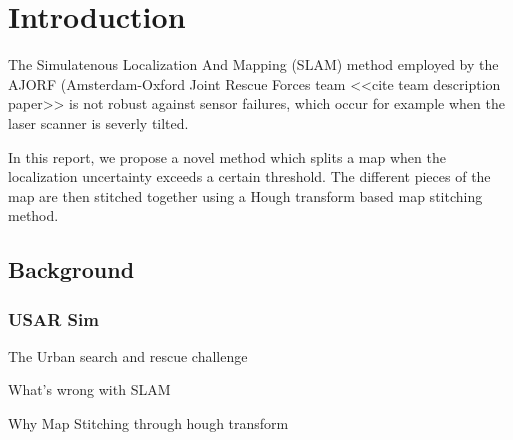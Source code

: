 \chapter{Introduction}
\label{chapter:introduction}
The Simulatenous Localization And Mapping (SLAM) method employed by the AJORF (Amsterdam-Oxford Joint Rescue Forces team <<cite team description paper>> is not robust against sensor failures, which occur for example when the laser scanner is severly tilted. 

In this report, we propose a novel method which splits a map when the localization uncertainty exceeds a certain threshold. The different pieces of the map are then stitched together using a Hough transform based map stitching method.

\section{Background}
\subsection{USAR Sim}
The Urban search and rescue challenge

What's wrong with SLAM

Why Map Stitching through hough transform